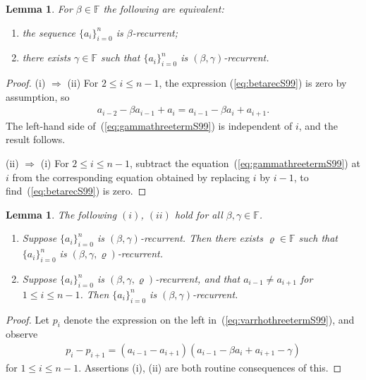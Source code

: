 \documentclass[pdftex]{sigma}
\numberwithin{equation}{section}
\newtheorem{Lemma}[Theorem]{Lemma}
\begin{document}
\begin{Lemma}\label{lem:brecvsbgrecS99}
For $\beta \in \mathbb F$ the following are equivalent:
\begin{enumerate}\itemsep=0pt
\item[$(i)$] the sequence
 $\lbrace a_i\rbrace_{i=0}^n$
is $\beta$-recurrent;
\item[$(ii)$] there exists $\gamma \in \mathbb F$ such that
 $\lbrace a_i\rbrace_{i=0}^n$ is $(\beta,\gamma)$-recurrent.
\end{enumerate}
\end{Lemma}
\begin{proof}
(i) $\Rightarrow$ (ii) For $2\leq i \leq n-1$, the expression
(\ref{eq:betarecS99}) is zero by assumption,
so
\begin{gather*}
a_{i-2}-\beta a_{i-1}+a_i =
a_{i-1}-\beta a_i+a_{i+1}.
\end{gather*}
The left-hand side of~(\ref{eq:gammathreetermS99}) is independent of $i$, and
the result follows.

(ii) $\Rightarrow$ (i) For $2\leq i \leq n-1$,
subtract the equation~(\ref{eq:gammathreetermS99}) at $i$ from the corresponding equation
obtained by replacing $i$ by $i-1$, to find~(\ref{eq:betarecS99}) is zero.
\end{proof}

\begin{Lemma}\label{lem:bgrecvsbgdrecS99}
The following $(i)$, $(ii)$ hold
for all $\beta, \gamma \in \mathbb F$.
\begin{enumerate}\itemsep=0pt
\item[$(i)$] Suppose
 $\lbrace a_i\rbrace_{i=0}^n$
is $(\beta,\gamma)$-recurrent. Then
there exists $\varrho \in \mathbb F$ such that
 $\lbrace a_i\rbrace_{i=0}^n$
 is $(\beta,\gamma,\varrho)$-recurrent.
\item[$(ii)$] Suppose
 $\lbrace a_i\rbrace_{i=0}^n$
is $(\beta,\gamma,\varrho)$-recurrent, and that $a_{i-1}\not=a_{i+1}$
for $1 \leq i\leq n-1$. Then
 $\lbrace a_i\rbrace_{i=0}^n$
 is $(\beta,\gamma)$-recurrent.
\end{enumerate}
\end{Lemma}

\begin{proof}Let $p_i$ denote the expression on the left in~(\ref{eq:varrhothreetermS99}),
and observe
 \begin{gather*}
p_i-p_{i+1} = (a_{i-1}-a_{i+1})(a_{i-1}-\beta a_i +a_{i+1} - \gamma)
\end{gather*}
for $1 \leq i \leq n-1$. Assertions (i), (ii) are both routine consequences of this.
\end{proof}
\end{document}
